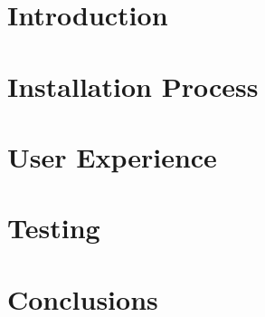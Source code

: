 \setcounter{page}{2}


\newpage
\tableofcontents
\newpage
{}
{}
\listoftables

\clearpage
\section{Introduction}
\label{sect:introduction}


\clearpage
\section{Installation Process}
\label{sect:installsetup}


\clearpage
\section{User Experience}
\label{sect:ux}


\clearpage
\section{Testing}
\label{sect:testing}


\clearpage
\section{Conclusions}
\label{sect:conclusions}




